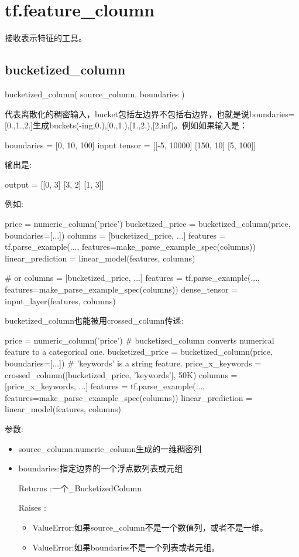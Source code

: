 \section{tf.feature\_cloumn}
接收表示特征的工具。
\subsection{bucketized\_column}
\begin{python}
bucketized_column(
    source_column,
    boundaries
)
\end{python}
代表离散化的稠密输入，bucket包括左边界不包括右边界，也就是说boundaries=[0.,1.,2.]生成buckets(-ing,0.),[0.,1.),[1.,2.),[2,inf)。例如如果输入是：
\begin{python}
boundaries = [0, 10, 100]
input tensor = [[-5, 10000]
                [150,   10]
                [5,    100]]
\end{python}
输出是:
\begin{python}
output = [[0, 3]
          [3, 2]
          [1, 3]]
\end{python}
例如:\par
\begin{python}
price = numeric_column('price')
bucketized_price = bucketized_column(price, boundaries=[...])
columns = [bucketized_price, ...]
features = tf.parse_example(..., features=make_parse_example_spec(columns))
linear_prediction = linear_model(features, columns)

# or
columns = [bucketized_price, ...]
features = tf.parse_example(..., features=make_parse_example_spec(columns))
dense_tensor = input_layer(features, columns)
\end{python}
bucketized\_column也能被用crossed\_column传递:
\begin{python}
price = numeric_column('price')
# bucketized_column converts numerical feature to a categorical one.
bucketized_price = bucketized_column(price, boundaries=[...])
# 'keywords' is a string feature.
price_x_keywords = crossed_column([bucketized_price, 'keywords'], 50K)
columns = [price_x_keywords, ...]
features = tf.parse_example(..., features=make_parse_example_spec(columns))
linear_prediction = linear_model(features, columns)
\end{python}
参数:
\begin{itemize}
	\item source\_column:numeric\_column生成的一维稠密列
	\item boundaries:指定边界的一个浮点数列表或元组
	\item[Returns]:一个\_BucketizedColumn
	\item[Raises]:
	\begin{itemize}
		\item ValueError:如果source\_column不是一个数值列，或者不是一维。
		\item ValueError:如果boundaries不是一个列表或者元组。
	\end{itemize}
\end{itemize}
